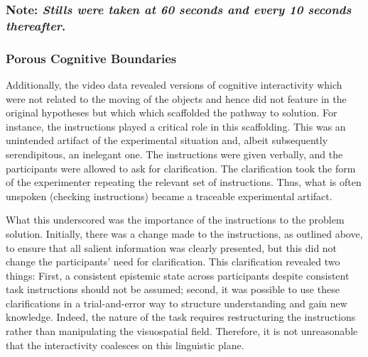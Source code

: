 \documentclass{article}
\begin{document}
\subsubsection{Note: \emph{Stills were taken at 60 seconds and every 10 seconds thereafter}.}

\subsubsection{}

\subsubsection{Porous Cognitive Boundaries}

Additionally, the video data revealed versions of cognitive interactivity which were not related to the moving of the objects and hence did not feature in the original hypotheses but which which scaffolded the pathway to solution. For instance, the instructions played a critical role in this scaffolding. This was an unintended artifact of the experimental situation and, albeit subsequently serendipitous, an inelegant one. The instructions were given verbally, and the participants were allowed to ask for clarification. The clarification took the form of the experimenter repeating the relevant set of instructions. Thus, what is often unspoken (checking instructions) became a traceable experimental artifact. 

What this underscored was the importance of the instructions to the problem solution. Initially, there was a change made to the instructions, as outlined above, to ensure that all salient information was clearly presented, but this did not change the participants' need for clarification. This clarification revealed two things: First, a consistent epistemic state across participants despite consistent task instructions should not be assumed; second, it was possible to use these clarifications in a trial-and-error way to structure understanding and gain new knowledge. Indeed, the nature of the task requires restructuring the instructions rather than manipulating the visuospatial field. Therefore, it is not unreasonable that the interactivity coalesces on this linguistic plane. 
\end{document}
